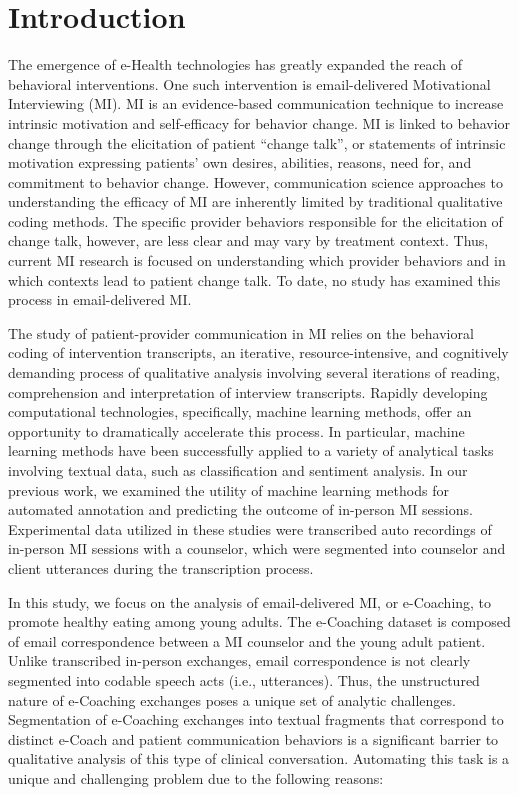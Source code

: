 \documentclass{amia}
\begin{document}
\section*{Introduction}
The emergence of e-Health technologies has greatly expanded the reach of behavioral interventions. One such intervention is email-delivered Motivational Interviewing (MI). MI is an evidence-based communication technique to increase intrinsic motivation and self-efficacy for behavior change\cite{miller2012motivational,miller2009toward}. MI is linked to behavior change through the elicitation of patient ``change talk'', or statements of intrinsic motivation expressing patients’ own desires, abilities, reasons, need for, and commitment to behavior change\cite{apodaca2009mechanisms}. However, communication science approaches to understanding the efficacy of MI are inherently limited by traditional qualitative coding methods. The specific provider behaviors responsible for the elicitation of change talk, however, are less clear and may vary by treatment context. Thus, current MI research is focused on understanding which provider behaviors and in which contexts lead to patient change talk. To date, no study has examined this process in email-delivered MI.

The study of patient-provider communication in MI relies on the behavioral coding of intervention transcripts, an iterative, resource-intensive, and cognitively demanding process of qualitative analysis involving several iterations of reading, comprehension and interpretation of interview transcripts. Rapidly developing computational technologies, specifically, machine learning methods, offer an opportunity to dramatically accelerate this process. In particular, machine learning methods have been successfully applied to a variety of analytical tasks involving textual data, such as classification\cite{nigam2000text} and sentiment analysis.\cite{wang2012baselines} In our previous work, we examined the utility of machine learning methods for automated annotation \cite{hasan2016study,kotov2015interpretable} and predicting the outcome \cite{hasan2018predicting} of in-person MI sessions. Experimental data utilized in these studies were transcribed auto recordings of in-person MI sessions with a counselor, which were segmented into counselor and client utterances during the transcription process. 

In this study, we focus on the analysis of email-delivered MI, or e-Coaching, to promote healthy eating among young adults. The e-Coaching dataset is composed of email correspondence between a MI counselor and the young adult patient. Unlike transcribed in-person exchanges, email correspondence is not clearly segmented into codable speech acts (i.e., utterances). Thus, the unstructured nature of e-Coaching exchanges poses a unique set of analytic challenges. Segmentation of e-Coaching exchanges into textual fragments that correspond to distinct e-Coach and patient communication behaviors is a significant barrier to qualitative analysis of this type of clinical conversation. Automating this task is a unique and challenging problem due to the following reasons:
\end{document}
